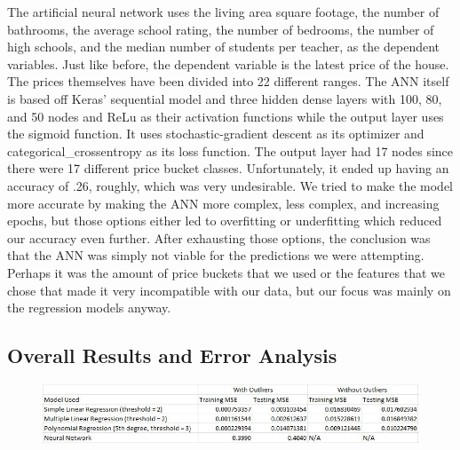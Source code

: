 \documentclass[12pt]{article}
\begin{document}
	The artificial neural network uses the living area square footage, the number of bathrooms, the average school rating, the number of bedrooms, the number of high schools, and the median number of students per teacher, as the dependent variables. Just like before, the dependent variable is the latest price of the house. The prices themselves have been divided into 22 different ranges. The ANN itself is based off Keras' sequential model and three hidden dense layers with 100, 80, and 50 nodes and ReLu as their activation functions while the output layer uses the sigmoid function. It uses stochastic-gradient descent as its optimizer and categorical\_crossentropy as its loss function. The output layer had 17 nodes since there were 17 different price bucket classes. Unfortunately, it ended up having an accuracy of .26, roughly, which was very undesirable. We tried to make the model more accurate by making the ANN more complex, less complex, and increasing epochs, but those options either led to overfitting or underfitting which reduced our accuracy even further. After exhausting those options, the conclusion was that the ANN was simply not viable for the predictions we were attempting. Perhaps it was the amount of price buckets that we used or the features that we chose that made it very incompatible with our data, but our focus was mainly on the regression models anyway.
	
	\subsection{Overall Results and Error Analysis}
	
	\begin{figure}[H]
		\label{fig:fig5}
		\includegraphics[width=1\linewidth]{fig5}
	\end{figure}
	
\end{document}
